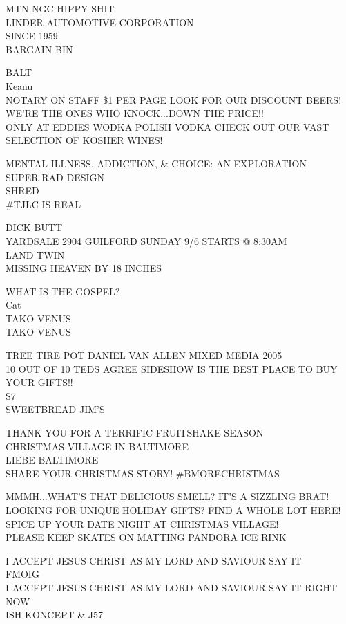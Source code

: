 \documentclass[10pt,letterpaper]{article}
\begin{document}
MTN NGC HIPPY SHIT\\
LINDER AUTOMOTIVE CORPORATION\\
SINCE 1959\\
BARGAIN BIN

BALT\\
Keanu\\
NOTARY ON STAFF \$1 PER PAGE LOOK FOR OUR DISCOUNT BEERS!  WE'RE THE ONES WHO KNOCK...DOWN THE PRICE!!\\
ONLY AT EDDIES WODKA POLISH VODKA CHECK OUT OUR VAST SELECTION OF KOSHER WINES!

MENTAL ILLNESS, ADDICTION, \& CHOICE: AN EXPLORATION\\
SUPER RAD DESIGN\\
SHRED\\
\#TJLC IS REAL

DICK BUTT\\
YARDSALE 2904 GUILFORD SUNDAY 9/6 STARTS @ 8:30AM\\
LAND TWIN\\
MISSING HEAVEN BY 18 INCHES

WHAT IS THE GOSPEL?\\
Cat\\
TAKO VENUS\\
TAKO VENUS

TREE TIRE POT DANIEL VAN ALLEN MIXED MEDIA 2005\\
10 OUT OF 10 TEDS AGREE SIDESHOW IS THE BEST PLACE TO BUY YOUR GIFTS!!\\
S7\\
SWEETBREAD JIM'S

THANK YOU FOR A TERRIFIC FRUITSHAKE SEASON\\
CHRISTMAS VILLAGE IN BALTIMORE\\
LIEBE BALTIMORE\\
SHARE YOUR CHRISTMAS STORY!  \#BMORECHRISTMAS

MMMH...WHAT'S THAT DELICIOUS SMELL?  IT'S A SIZZLING BRAT!\\
LOOKING FOR UNIQUE HOLIDAY GIFTS?  FIND A WHOLE LOT HERE!\\
SPICE UP YOUR DATE NIGHT AT CHRISTMAS VILLAGE!\\
PLEASE KEEP SKATES ON MATTING PANDORA ICE RINK

I ACCEPT JESUS CHRIST AS MY LORD AND SAVIOUR SAY IT\\
FMOIG\\
I ACCEPT JESUS CHRIST AS MY LORD AND SAVIOUR SAY IT RIGHT NOW\\
ISH KONCEPT \& J57
\end{document}
